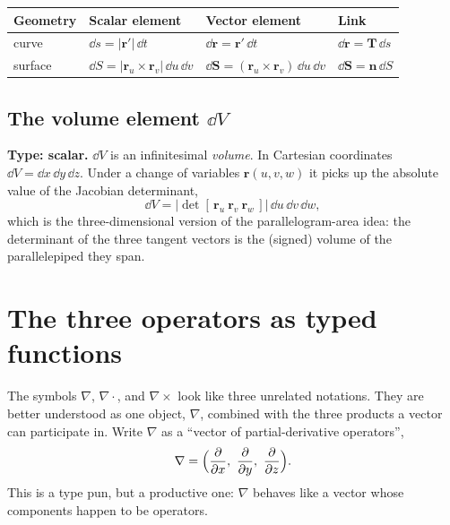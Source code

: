 \documentclass{essay}
\newcommand{\rr}{\mathbf{r}}
\newcommand{\nn}{\mathbf{n}}
\newcommand{\TT}{\mathbf{T}}
\begin{document}
\begin{center}
  \renewcommand{\arraystretch}{1.35}
  \begin{tabular}{@{}l l l l@{}}
    \toprule
    \textbf{Geometry} & \textbf{Scalar element} & \textbf{Vector element} & \textbf{Link} \\
    \midrule
    curve   & \(\dd s = \lvert\rr'\rvert\,\dd t\)
    & \(\dd\mathbf{r}=\rr'\,\dd t\)
    & \(\dd\mathbf{r}=\TT\,\dd s\) \\
    surface & \(\dd S=\lvert\rr_{u}\times\rr_{v}\rvert\,\dd u\,\dd v\)
    & \(\dd\mathbf{S}=(\rr_{u}\times\rr_{v})\,\dd u\,\dd v\)
    & \(\dd\mathbf{S}=\nn\,\dd S\) \\
    \bottomrule
  \end{tabular}
\end{center}

\subsection{The volume element \(\dd V\)}

\textbf{Type: scalar.} \(\dd V\) is an infinitesimal \emph{volume}. In Cartesian
coordinates \(\dd V = \dd x\,\dd y\,\dd z\). Under a change of variables
\(\rr(u,v,w)\) it picks up the absolute value of the Jacobian determinant,
\[ \dd V = \bigl\lvert \det[\,\rr_{u}\ \rr_{v}\ \rr_{w}\,] \bigr\rvert \,\dd u\,\dd v\,\dd w, \]
which is the three-dimensional version of the parallelogram-area idea: the
determinant of the three tangent vectors is the (signed) volume of the
parallelepiped they span.

\section{The three operators as typed functions}

The symbols \(\nabla\), \(\nabla\cdot\), and \(\nabla\times\) look like three unrelated
notations. They are better understood as one object, \(\nabla\), combined with the
three products a vector can participate in. Write \(\nabla\) as a ``vector of
partial-derivative operators'',
\[
  \nabla = \Bigl(\frac{\partial}{\partial x},\ \frac{\partial}{\partial y},\
  \frac{\partial}{\partial z}\Bigr).
\]
This is a type pun, but a productive one: \(\nabla\) behaves like a vector whose
components happen to be operators.
\end{document}
